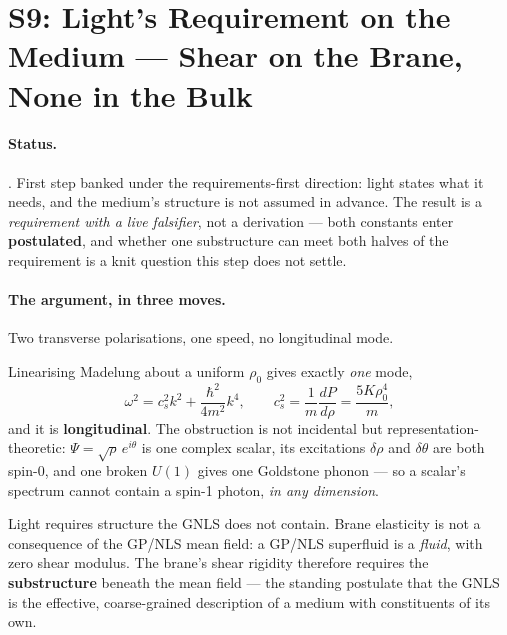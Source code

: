 \section{S9: Light's Requirement on the Medium --- Shear on the Brane, None in
the Bulk}\label{step:S9}

\claimstatus{\StatusOpen}

\paragraph{Status.}
\StatusOpen. First step banked under the requirements-first direction: light
states what it needs, and the medium's structure is not assumed in advance. The
result is a \emph{requirement with a live falsifier}, not a derivation --- both
constants enter \textbf{postulated}, and whether one substructure can meet both
halves of the requirement is a knit question this step does not settle.

\paragraph{The argument, in three moves.}
 Two transverse polarisations, one
speed, no longitudinal mode.

 Linearising Madelung about a uniform
\(\rho_0\) gives exactly \emph{one} mode,
\[
  \omega^2 = c_s^2k^2 + \frac{\hbar^2}{4m^2}k^4,
  \qquad
  c_s^2 = \frac{1}{m}\frac{dP}{d\rho} = \frac{5K\rho_0^4}{m},
\]
and it is \textbf{longitudinal}. The obstruction is not incidental but
representation-theoretic: \(\Psi=\sqrt{\rho}\,e^{i\theta}\) is one complex
scalar, its excitations \(\delta\rho\) and \(\delta\theta\) are both spin-0, and
one broken \(U(1)\) gives one Goldstone phonon --- so a scalar's spectrum cannot
contain a spin-1 photon, \emph{in any dimension}.

 Light requires structure the GNLS does not
contain. Brane elasticity is not a consequence of the GP/NLS mean field: a
GP/NLS superfluid is a \emph{fluid}, with zero shear modulus. The brane's shear
rigidity therefore requires the \textbf{substructure} beneath the mean field ---
the standing postulate that the GNLS is the effective, coarse-grained
description of a medium with constituents of its own.

